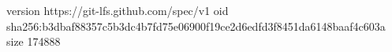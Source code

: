 version https://git-lfs.github.com/spec/v1
oid sha256:b3dbaf88357c5b3dc4b7fd75e06900f19ce2d6edfd3f8451da6148baaf4c603a
size 174888
